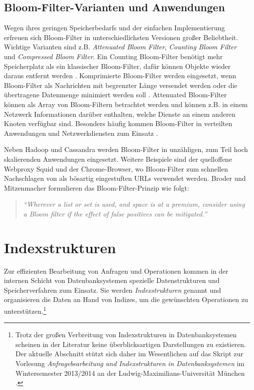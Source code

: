 \subsection{Bloom-Filter-Varianten und Anwendungen}\label{sec:bloom-anwendungen}
Wegen ihres geringen Speicherbedarfs und der einfachen Implementierung erfreuen sich Bloom-Filter in unterschiedlichsten Versionen großer Beliebtheit. Wichtige Varianten sind z.B. \textit{Attenuated Bloom Filter}, \textit{Counting Bloom Filter} und \textit{Compressed Bloom Filter}. Ein Counting Bloom-Filter benötigt mehr Speicherplatz als ein klassischer Bloom-Filter, dafür können Objekte wieder daraus entfernt werden \cite{Fan2000}. Komprimierte Bloom-Filter werden eingesetzt, wenn Bloom-Filter als Nachrichten mit begrenzter Länge versendet werden oder die übertragene Datenmenge minimiert werden soll \cite{Mitzenmacher2002}. Attenuated Bloom-Filter \cite{Sakuma2011} können als Array von Bloom-Filtern betrachtet werden und \mbox{können} z.B. in einem Netzwerk Informationen darüber enthalten, welche Dienste an einem anderen Knoten verfügbar sind. Besonders häufig kommen Bloom-Filter in verteilten Anwendungen und Netzwerkdiensten zum Einsatz \cite{Broder2004}. 

Neben Hadoop und Cassandra werden Bloom-Filter in unzähligen, zum Teil hoch skalierenden Anwendungen eingesetzt. Weitere Beispiele sind der quelloffene Webproxy Squid und der Chrome-Browser, wo Bloom-Filter zum schnellen Nachschlagen von als bösartig eingestuften URLs verwendet werden. Broder und Mitzenmacher formulieren das Bloom-Filter-Prinzip wie folgt: 
\begin{quote}
\textit{"`Wherever a list or set is used, and space is at a premium, consider using a Bloom filter if the effect of false positives can be mitigated."'} \cite{Broder2004}
\end{quote}
\section{Indexstrukturen}\label{sec:index}
Zur effizienten Bearbeitung von Anfragen und Operationen kommen in der internen Schicht von Datenbanksystemen spezielle Datenstrukturen und Speicherverfahren zum Einsatz. Sie werden \textit{Indexstrukturen} genannt und organisieren die Daten an Hand von Indizes, um die gewünschten Operationen zu unterstützen.\footnote{Trotz der großen Verbreitung von Indexstrukturen in Datenbanksystemen scheinen in der Literatur keine überblicksartigen Darstellungen zu existieren. Der aktuelle Abschnitt stützt sich daher im Wesentlichen auf das Skript zur Vorlesung \textit{Anfragebearbeitung und Indexstrukturen in Datenbanksystemen} im Wintersemester 2013/2014 an der Ludwig-Maximilians-Universität München \cite{Kriegel1994--2013}.}

